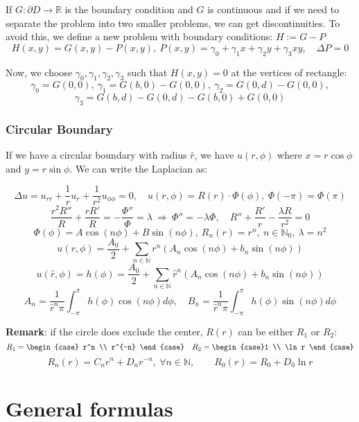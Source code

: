 \documentclass[a4paper]{article}
\begin{document}
\begin{twocolumn}
If $G:\partial D \rightarrow \mathbb{R}$ is the boundary condition and $G$ is continuous and if we need to separate the problem into two smaller problems, we can get discontinuities. To avoid this, we define a new problem with boundary conditions: $H := G - P$
$$H(x,y) = G(x,y) - P(x,y), \ P(x,y) = \gamma_0 + \gamma_1 x + \gamma_2 y + \gamma_3 xy, \quad \Delta P = 0$$

Now, we choose $\gamma_0, \gamma_1, \gamma_2, \gamma_3$ such that $H(x,y) = 0$ at the vertices of rectangle:
$$\gamma_0 = G(0,0), \ \gamma_1 = G(b,0) - G(0,0), \ \gamma_2 = G(0,d) - G(0,0), $$
$$ \gamma_3 = G(b,d) - G(0,d) - G(b,0) + G(0,0)$$

\subsubsection{Circular Boundary}

If we have a circular boundary with radius $\hat{r}$, we have $u(r,\phi)$ where $x=r \cos \phi$ and $y = r \sin \phi$. We can write the Laplacian as:

$$\Delta u = u_{rr} + \frac1r u_r + \frac{1}{r^2} u_{\phi \phi} = 0, \quad u(r,\phi) = R(r) \cdot \Phi(\phi), \ \Phi(-\pi) = \Phi(\pi)$$
$$\frac{r^2 R''}{R} + \frac{r R'}{R} = -\frac{\Phi''}{\Phi} = \lambda \ \Rightarrow \ \Phi'' = -\lambda \Phi, \quad R'' + \frac{R'}{r} - \frac{\lambda R}{r^2} = 0$$
$$\Phi(\phi) = A \cos(n \phi) + B \sin(n \phi), \ R_n(r) = r^n, \ n \in \mathbb{N}_0, \ \lambda = n^2$$
$$u(r,\phi) = \frac{A_0}{2} + \sum_{n \in \mathbb{N}} r^n \left(A_n \cos(n\phi) + b_n \sin(n\phi)\right)$$
$$u(\hat r, \phi) = h(\phi) = \frac{A_0}{2} + \sum_{n \in \mathbb{N}} \hat r^n \left(A_n \cos(n\phi) + b_n \sin(n\phi)\right)$$
$$A_n = \frac{1}{\hat r^n \pi} \int_{-\pi}^{\pi} h(\phi) \cos(n\phi) d\phi, \quad B_n = \frac{1}{\hat r^n\pi} \int_{-\pi}^{\pi} h(\phi) \sin(n\phi) d\phi $$

\textbf{Remark}: if the circle does exclude the center, $R(r)$ can be either $R_1$ or $R_2$:
$$R_1 = \begin{case} r^n \\ r^{-n} \end{case} \quad R_2 = \begin{case}1 \\ \ln r \end{case}$$
$$R_n(r) = C_n r^n + D_n r^{-n}, \ \forall n \in \mathbb{N}, \qquad R_0(r) = R_0 + D_0 \ln r$$

\section{General formulas}


\end{twocolumn}
\end{document}
